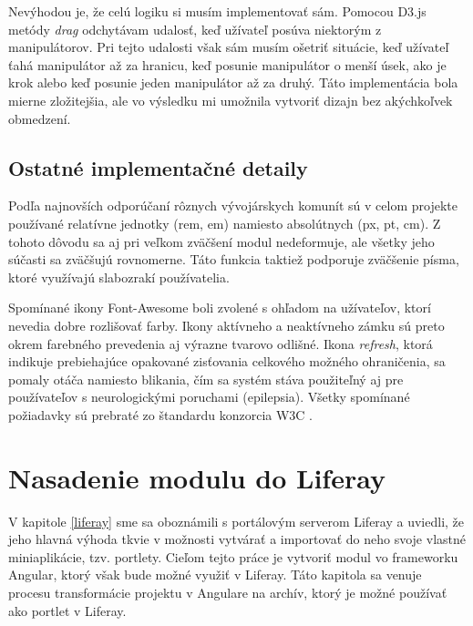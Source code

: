 \documentclass[
  digital, %
  twoside, %
  notable,   %
  nolof,   %
  nolot,   %
]{fithesis3}
\begin{document}
Nevýhodou je, že celú logiku si musím implementovať sám. Pomocou D3.js metódy \textit{drag} odchytávam udalosť, keď užívateľ posúva niektorým z manipulátorov. Pri tejto udalosti však sám musím ošetriť situácie, keď užívateľ ťahá manipulátor až za hranicu, keď posunie manipulátor o menší úsek, ako je krok alebo keď posunie jeden manipulátor až za druhý. Táto implementácia bola mierne zložitejšia, ale vo výsledku mi umožnila vytvoriť dizajn bez akýchkoľvek obmedzení.

\section{Ostatné implementačné detaily}
Podľa najnovších odporúčaní rôznych vývojárskych komunít \cite{Etienne2017} sú v celom projekte používané relatívne jednotky (rem, em) namiesto absolútnych (px, pt, cm). Z tohoto dôvodu sa aj pri veľkom zväčšení modul nedeformuje, ale všetky jeho súčasti sa zväčšujú rovnomerne. Táto funkcia taktiež podporuje zväčšenie písma, ktoré využívajú slabozrakí používatelia.

Spomínané ikony Font-Awesome boli zvolené s ohľadom na užívateľov, ktorí nevedia dobre rozlišovať farby. Ikony aktívneho a neaktívneho zámku sú preto okrem farebného prevedenia aj výrazne tvarovo odlišné. Ikona \textit{refresh}, ktorá indikuje prebiehajúce opakované zisťovania celkového možného ohraničenia, sa pomaly otáča namiesto blikania, čím sa systém stáva použiteľný aj pre používateľov s neurologickými poruchami (epilepsia). Všetky spomínané požiadavky sú prebraté zo štandardu konzorcia W3C \cite{caldwell2008web}.

\chapter{Nasadenie modulu do Liferay}
V kapitole \ref{liferay} sme sa oboznámili s portálovým serverom Liferay a uviedli, že jeho hlavná výhoda tkvie v možnosti vytvárať a importovať do neho svoje vlastné miniaplikácie, tzv. portlety. Cieľom tejto práce je vytvoriť modul vo frameworku Angular, ktorý však bude možné využiť v Liferay. Táto kapitola sa venuje procesu transformácie projektu v Angulare na archív, ktorý je možné používať ako portlet v Liferay.
\end{document}

